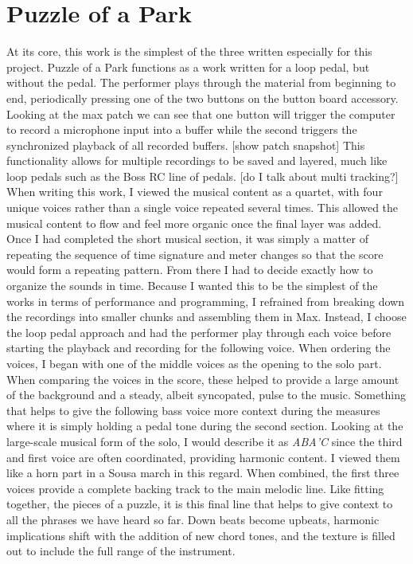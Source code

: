 \section{Puzzle of a Park}
At its core, this work is the simplest of the three written especially for this project. Puzzle of a Park functions as a work written for a loop pedal, but without the pedal. The performer plays through the material from beginning to end, periodically pressing one of the two buttons on the button board accessory. Looking at the max patch we can see that one button will trigger the computer to record a microphone input into a buffer while the second triggers the synchronized playback of all recorded buffers. 
[show patch snapshot]
This functionality allows for multiple recordings to be saved and layered, much like loop pedals such as the Boss RC line of pedals. [do I talk about multi tracking?]
When writing this work, I viewed the musical content as a quartet, with four unique voices rather than a single voice repeated several times. This allowed the musical content to flow and feel more organic once the final layer was added. 
Once I had completed the short musical section, it was simply a matter of repeating the sequence of time signature and meter changes so that the score would form a repeating pattern. From there I had to decide exactly how to organize the sounds in time. Because I wanted this to be the simplest of the works in terms of performance and programming, I refrained from breaking down the recordings into smaller chunks and assembling them in Max. Instead, I choose the loop pedal approach and had the performer play through each voice before starting the playback and recording for the following voice. 
When ordering the voices, I began with one of the middle voices as the opening to the solo part. When comparing the voices in the score, these helped to provide a large amount of the background and a steady, albeit syncopated, pulse to the music. Something that helps to give the following bass voice more context during the measures where it is simply holding a pedal tone during the second section. Looking at the large-scale musical form of the solo, I would describe it as \emph{ABA'C} since the third and first voice are often coordinated, providing harmonic content. I viewed them like a horn part in a Sousa march in this regard. When combined, the first three voices provide a complete backing track to the main melodic line. Like fitting together, the pieces of a puzzle, it is this final line that helps to give context to all the phrases we have heard so far. Down beats become upbeats, harmonic implications shift with the addition of new chord tones, and the texture is filled out to include the full range of the instrument.



